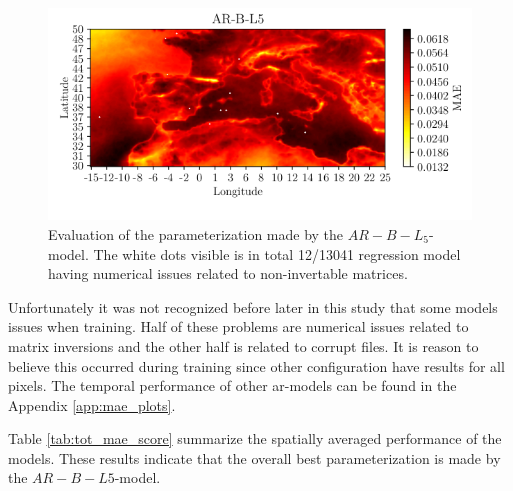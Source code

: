 \begin{figure}[ht]
    \centering
    \includegraphics{python_figs/mea_best_ar_model_tcc_L5_in_folder_AR-B-L5.png}
    \caption{Evaluation of the parameterization made by the $AR-B-L_5$-model. The white dots visible is in total 12/13041 regression model having numerical issues related to non-invertable matrices.}
    \label{fig:MAE_AR}
\end{figure}


Unfortunately it was not recognized before later in this study that 
some models issues when training. Half of these problems are numerical issues related to matrix inversions and the other half is related to corrupt files. It is reason to believe this occurred during training since other configuration have results for all pixels. The temporal performance of other \acrshort{ar}-models can be found in the Appendix \ref{app:mae_plots}.

Table \ref{tab:tot_mae_score} summarize the spatially averaged performance of the models. These results indicate that the overall best parameterization is made by the $AR-B-L5$-model. %


